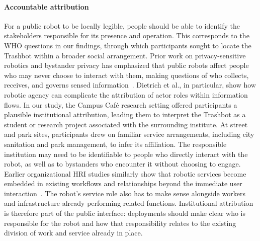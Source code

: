 \paragraph{Accountable attribution} For a public robot to be locally legible, people should be able to identify the stakeholders responsible for its presence and operation. This corresponds to the WHO questions in our findings, through which participants sought to locate the Trashbot within a broader social arrangement. Prior work on privacy-sensitive robotics and bystander privacy has emphasized that public robots affect people who may never choose to interact with them, making questions of who collects, receives, and governs sensed information~\cite{rueben2018themes, dietrich2026bystander}. Dietrich et al., in particular, show how robotic agency can complicate the attribution of actor roles within information flows. In our study, the Campus Café research setting offered participants a plausible institutional attribution, leading them to interpret the Trashbot as a student or research project associated with the surrounding institute. At street and park sites, participants drew on familiar service arrangements, including city sanitation and park management, to infer its affiliation. The responsible institution may need to be identifiable to people who directly interact with the robot, as well as to bystanders who encounter it without choosing to engage. Earlier organizational HRI studies similarly show that robotic services become embedded in existing workflows and relationships beyond the immediate user interaction~\cite{mutlu2008robots,lee2012ripple}. The robot's service role also has to make sense alongside workers and infrastructure already performing related functions. Institutional attribution is therefore part of the public interface: deployments should make clear who is responsible for the robot and how that responsibility relates to the existing division of work and service already in place.

